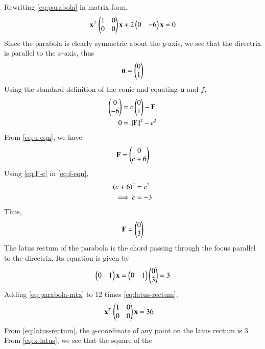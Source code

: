 \documentclass[journal,12pt,twocolumn]{IEEEtran}
\renewcommand{\vec}[1]{\boldsymbol{\mathbf{#1}}}
\begin{document}
\begin{enumerate}
    \solution Rewriting \eqref{eq:parabola} in matrix form,
    \begin{align}
        \vec{x}^\top\myvec{1&0\\0&0}\vec{x} + 2\myvec{0&-6}\vec{x} = 0
        \label{eq:parabola-mtx}
    \end{align}
    Since the parabola is clearly symmetric about the $y$-axis, we see that
    the directrix is parallel to the $x$-axis, thus
    \begin{align}
        \vec{n} = \myvec{0\\1}
        \label{eq:n}
    \end{align}
    Using the standard definition of the conic and equating $\vec{u}$ and $f$,
    \begin{align}
        \myvec{0\\-6} &= c\myvec{0\\1} - \vec{F} \label{eq:u-eqn} \\
        0 &= \norm{\vec{F}}^2 - c^2 \label{eq:f-eqn}
    \end{align}
    From \eqref{eq:u-eqn}, we have
    \begin{align}
        \vec{F} = \myvec{0\\c+6}
        \label{eq:F-c}
    \end{align}
    Using \eqref{eq:F-c} in \eqref{eq:f-eqn},
    \begin{align}
        \left(c+6\right)^2&=c^2 \\
        \implies c&=-3
        \label{eq:c-sol}
    \end{align}
    Thus,
    \begin{align}
        \vec{F} = \myvec{0\\3}
    \end{align}
    The latus rectum of the parabola is the chord passing through the focus 
    parallel to the directrix. Its equation is given by
    \begin{align}
        \myvec{0&1}\vec{x} = \myvec{0&1}\myvec{0\\3} = 3
        \label{eq:latus-rectum}
    \end{align}
    Adding \eqref{eq:parabola-mtx} to 12 times \eqref{eq:latus-rectum},
    \begin{align}
        \vec{x}^\top\myvec{1&0\\0&0}\vec{x} &= 36
        \label{eq:x-latus}
    \end{align}
    From \eqref{eq:latus-rectum}, the $y$-coordinate of any point on the latus
    rectum is 3. From \eqref{eq:x-latus}, we see that the square of the

\end{enumerate}
\end{document}
